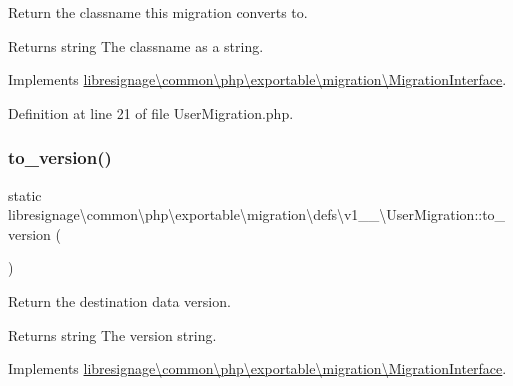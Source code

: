 Return the classname this migration converts to.

\begin{DoxyReturn}{Returns}
string The classname as a string. 
\end{DoxyReturn}


Implements \hyperlink{interfacelibresignage_1_1common_1_1php_1_1exportable_1_1migration_1_1MigrationInterface_ab1f33cdd8684595d6b000bcbc7c4d5a4}{libresignage\textbackslash{}common\textbackslash{}php\textbackslash{}exportable\textbackslash{}migration\textbackslash{}\+Migration\+Interface}.



Definition at line 21 of file User\+Migration.\+php.

\mbox{\label{classlibresignage_1_1common_1_1php_1_1exportable_1_1migration_1_1defs_1_1v1__0__0_1_1UserMigration_ace8b9b29fe930534760ce4c51b7273a4}} 
\subsubsection{\texorpdfstring{to\+\_\+version()}{to\_version()}}
{\footnotesize\ttfamily static libresignage\textbackslash{}common\textbackslash{}php\textbackslash{}exportable\textbackslash{}migration\textbackslash{}defs\textbackslash{}v1\+\_\+\_\textbackslash{}\+User\+Migration\+::to\+\_\+version (\begin{DoxyParamCaption}{ }\end{DoxyParamCaption})\hspace{0.3cm}{\ttfamily [static]}}

Return the destination data version.

\begin{DoxyReturn}{Returns}
string The version string. 
\end{DoxyReturn}


Implements \hyperlink{interfacelibresignage_1_1common_1_1php_1_1exportable_1_1migration_1_1MigrationInterface_a9eddabf63771d4d1081bd6d067c7dff5}{libresignage\textbackslash{}common\textbackslash{}php\textbackslash{}exportable\textbackslash{}migration\textbackslash{}\+Migration\+Interface}.



